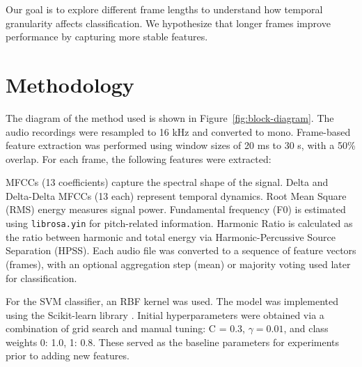 \documentclass[conference]{IEEEtran}
\begin{document}
Our goal is to explore different frame lengths to understand how temporal granularity affects classification. 
We hypothesize that longer frames improve performance by capturing more stable features.

\section{Methodology}

The diagram of the method used is shown in Figure~\ref{fig:block-diagram}.
The audio recordings were resampled to 16 kHz and converted to mono. 
Frame-based feature extraction was performed using window sizes of 20 ms to 30 s, with a 50\% overlap. 
For each frame, the following features were extracted:

MFCCs (13 coefficients) capture the spectral shape of the signal.
Delta and Delta-Delta MFCCs (13 each) represent temporal dynamics.
Root Mean Square (RMS) energy measures signal power.
Fundamental frequency (F0) is estimated using \texttt{librosa.yin} \cite{librosa} for pitch-related information.
Harmonic Ratio is calculated as the ratio between harmonic and total energy via Harmonic-Percussive Source Separation (HPSS).
Each audio file was converted to a sequence of feature vectors (frames), with an optional aggregation step (mean) or majority voting used later for classification.

For the SVM classifier, an RBF kernel was used. The model was implemented using the Scikit-learn library \cite{sklearn}.
Initial hyperparameters were obtained via a combination of grid search and manual tuning: C = 0.3, $\gamma = 0.01$, and class weights {0: 1.0, 1: 0.8}. 
These served as the baseline parameters for experiments prior to adding new features.
\end{document}
